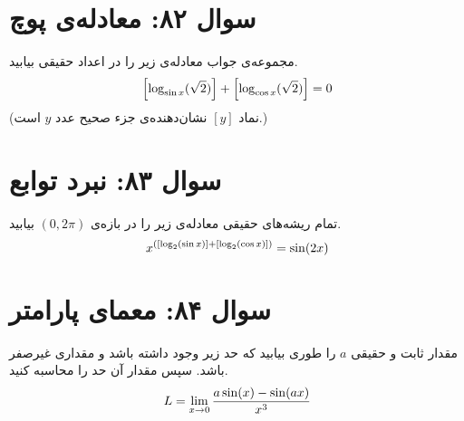 \documentclass[12pt]{article}
\begin{document}
\vspace{1cm}
\hrulefill
\vspace{1cm}

\section*{سوال ۸۲: معادله‌ی پوچ}
مجموعه‌ی جواب معادله‌ی زیر را در اعداد حقیقی بیابید.
\begin{displaymath}
	\Large \left[ \log_{\sin x} (\sqrt{2}) \right] + \left[ \log_{\cos x} (\sqrt{2}) \right] = 0
\end{displaymath}
(نماد \( [y] \) نشان‌دهنده‌ی جزء صحیح عدد \(y\) است.)

\vspace{1cm}
\hrulefill
\vspace{1cm}

\section*{سوال ۸۳: نبرد توابع}
تمام ریشه‌های حقیقی معادله‌ی زیر را در بازه‌ی \( (0, 2\pi) \) بیابید.
\begin{displaymath}
	\Large x^{\left( [\log_2(\sin x)] + [\log_2(\cos x)] \right)} = \sin(2x)
\end{displaymath}

\vspace{1cm}

\vspace{1cm}
\section*{سوال ۸۴: معمای پارامتر}
مقدار ثابت و حقیقی \(a\) را طوری بیابید که حد زیر وجود داشته باشد و مقداری غیرصفر باشد. سپس مقدار آن حد را محاسبه کنید.
\begin{displaymath}
	\Large L = \lim_{x \to 0} \frac{a\sin(x) - \sin(ax)}{x^3}
\end{displaymath}
\end{document}
